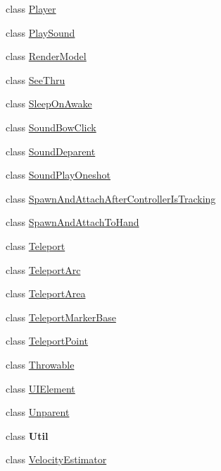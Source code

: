 \begin{DoxyCompactItemize}
\item 
class \mbox{\hyperlink{class_valve_1_1_v_r_1_1_interaction_system_1_1_player}{Player}}
\item 
class \mbox{\hyperlink{class_valve_1_1_v_r_1_1_interaction_system_1_1_play_sound}{Play\+Sound}}
\item 
class \mbox{\hyperlink{class_valve_1_1_v_r_1_1_interaction_system_1_1_render_model}{Render\+Model}}
\item 
class \mbox{\hyperlink{class_valve_1_1_v_r_1_1_interaction_system_1_1_see_thru}{See\+Thru}}
\item 
class \mbox{\hyperlink{class_valve_1_1_v_r_1_1_interaction_system_1_1_sleep_on_awake}{Sleep\+On\+Awake}}
\item 
class \mbox{\hyperlink{class_valve_1_1_v_r_1_1_interaction_system_1_1_sound_bow_click}{Sound\+Bow\+Click}}
\item 
class \mbox{\hyperlink{class_valve_1_1_v_r_1_1_interaction_system_1_1_sound_deparent}{Sound\+Deparent}}
\item 
class \mbox{\hyperlink{class_valve_1_1_v_r_1_1_interaction_system_1_1_sound_play_oneshot}{Sound\+Play\+Oneshot}}
\item 
class \mbox{\hyperlink{class_valve_1_1_v_r_1_1_interaction_system_1_1_spawn_and_attach_after_controller_is_tracking}{Spawn\+And\+Attach\+After\+Controller\+Is\+Tracking}}
\item 
class \mbox{\hyperlink{class_valve_1_1_v_r_1_1_interaction_system_1_1_spawn_and_attach_to_hand}{Spawn\+And\+Attach\+To\+Hand}}
\item 
class \mbox{\hyperlink{class_valve_1_1_v_r_1_1_interaction_system_1_1_teleport}{Teleport}}
\item 
class \mbox{\hyperlink{class_valve_1_1_v_r_1_1_interaction_system_1_1_teleport_arc}{Teleport\+Arc}}
\item 
class \mbox{\hyperlink{class_valve_1_1_v_r_1_1_interaction_system_1_1_teleport_area}{Teleport\+Area}}
\item 
class \mbox{\hyperlink{class_valve_1_1_v_r_1_1_interaction_system_1_1_teleport_marker_base}{Teleport\+Marker\+Base}}
\item 
class \mbox{\hyperlink{class_valve_1_1_v_r_1_1_interaction_system_1_1_teleport_point}{Teleport\+Point}}
\item 
class \mbox{\hyperlink{class_valve_1_1_v_r_1_1_interaction_system_1_1_throwable}{Throwable}}
\item 
class \mbox{\hyperlink{class_valve_1_1_v_r_1_1_interaction_system_1_1_u_i_element}{U\+I\+Element}}
\item 
class \mbox{\hyperlink{class_valve_1_1_v_r_1_1_interaction_system_1_1_unparent}{Unparent}}
\item 
class {\bfseries Util}
\item 
class \mbox{\hyperlink{class_valve_1_1_v_r_1_1_interaction_system_1_1_velocity_estimator}{Velocity\+Estimator}}
\end{DoxyCompactItemize}
